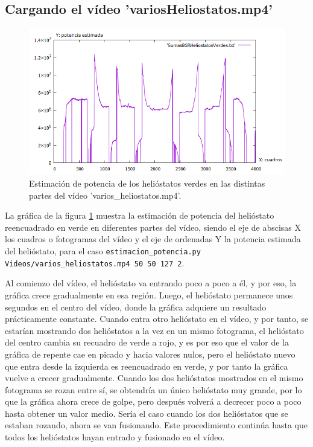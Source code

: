 \subsection{Cargando el vídeo 'variosHeliostatos.mp4'}

\begin{figure}[h!]
  	\centering
	\includegraphics[width=\textwidth]{ValidacionCualitativaFuncionEstimacionPotencia/SumasBGRHeliostatosVerdesVideo1.png}
	\caption{Estimación de potencia de los helióstatos verdes en las distintas partes del vídeo 'varios\_heliostatos.mp4'.
	\label{fig:ValidacionCualitativaFuncionEstimacionPotencia/SumasBGRHeliostatosVerdesVideo1.png}}
\end{figure}

La gráfica de la figura \ref{fig:ValidacionCualitativaFuncionEstimacionPotencia/SumasBGRHeliostatosVerdesVideo1.png} muestra la estimación de potencia del helióstato reencuadrado en verde en diferentes partes del vídeo, siendo el eje de abscisas X los cuadros o fotogramas del vídeo y el eje de ordenadas Y la potencia estimada del helióstato, para el caso \verb|estimacion_potencia.py Videos/varios_heliostatos.mp4 50 50 127 2|.

Al comienzo del vídeo, el helióstato va entrando poco a poco a él, y por eso, la gráfica crece gradualmente en esa región. Luego, el helióstato permanece unos segundos en el centro del vídeo, donde la gráfica adquiere un resultado prácticamente constante. Cuando entra otro helióstato en el vídeo, y por tanto, se estarían mostrando dos helióstatos a la vez en un mismo fotograma, el helióstato del centro cambia su recuadro de verde a rojo, y es por eso que el valor de la gráfica de repente cae en picado y hacia valores nulos, pero el helióstato nuevo que entra desde la izquierda es reencuadrado en verde, y por tanto la gráfica vuelve a crecer gradualmente. Cuando los dos helióstatos mostrados en el mismo fotograma se rozan entre sí, se obtendría un único helióstato muy grande, por lo que la gráfica ahora crece de golpe, pero después volverá a decrecer poco a poco hasta obtener un valor medio. Sería el caso cuando los dos helióstatos que se estaban rozando, ahora se van fusionando. Este procedimiento continúa hasta que todos los helióstatos hayan entrado y fusionado en el vídeo.

